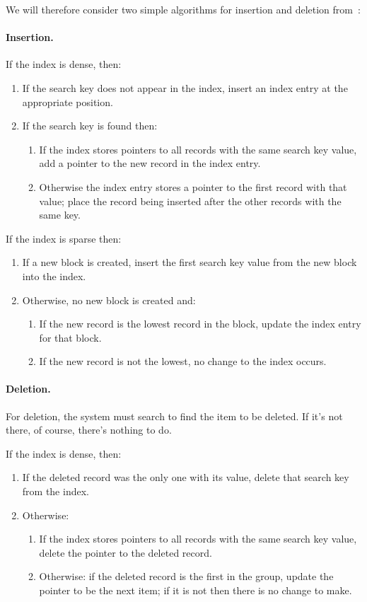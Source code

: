 \documentclass[a4paper]{report}
\begin{document}
We will therefore consider two simple algorithms for insertion and deletion from~\cite{dsc}:

\paragraph{Insertion.}
If the index is dense, then:
\begin{enumerate}
	\item If the search key does not appear in the index, insert an index entry at the appropriate position.
	\item If the search key is found then:
		\begin{enumerate}
			\item If the index stores pointers to all records with the same search key value, add a pointer to the new record in the index entry.
			\item Otherwise the index entry stores a pointer to the first record with that value; place the record being inserted after the other records with the same key.
		\end{enumerate}
\end{enumerate}

If the index is sparse then:

\begin{enumerate}
	\item If a new block is created, insert the first search key value from the new block into the index.
	\item Otherwise, no new block is created and:
		\begin{enumerate}
			\item If the new record is the lowest record in the block, update the index entry for that block.
			\item If the new record is not the lowest, no change to the index occurs.
		\end{enumerate}
\end{enumerate}

\paragraph{Deletion.}

For deletion, the system must search to find the item to be deleted. If it's not there, of course, there's nothing to do. 

If the index is dense, then:
\begin{enumerate}
	\item If the deleted record was the only one with its value, delete that search key from the index.
	\item Otherwise:
		\begin{enumerate}
			\item If the index stores pointers to all records with the same search key value, delete the pointer to the deleted record.
			\item Otherwise: if the deleted record is the first in the group, update the pointer to be the next item; if it is not then there is no change to make.
		\end{enumerate}
\end{enumerate}
\end{document}
